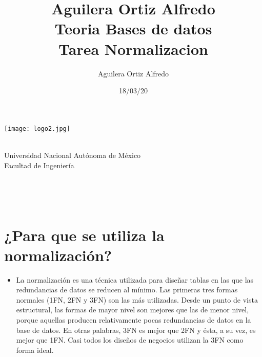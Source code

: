 \documentclass{report}
\title{Aguilera Ortiz Alfredo\\
       Teoria Bases de datos\\
	   Tarea Normalizacion
	   }
\date{18/03/20}
\author{Aguilera Ortiz Alfredo}
\begin{document}
	\begin{titlingpage}
		\begin{center}
			\centering
			\texttt{[image: logo2.jpg]}  
			\begin{LARGE}
				\\Universidad Nacional Autónoma de México\\
				Facultad de Ingeniería\\
			\end{LARGE}
			\vspace{2.5cm}
			\begin{Large}
				\textbf{\thetitle}\\
			\end{Large}
			\vspace{2cm}
			\theauthor\\
			\vspace{2cm}
			\thedate
		\end{center}
	\end{titlingpage}
	\newpage
	
	\section{¿Para que se utiliza la normalización? }
	\begin{itemize}
	\item  La normalización es una técnica utilizada para diseñar tablas en las que las redundancias de 		datos se reducen al mínimo. Las primeras tres formas normales (1FN, 2FN y 3FN) son las más 					utilizadas. Desde un punto de vista estructural, las formas de mayor nivel son mejores que las de 			menor nivel, porque aquellas producen relativamente pocas redundancias de datos en la base de datos. 		En otras palabras, 3FN es mejor que 2FN y ésta, a su vez, es mejor que 1FN. Casi todos los diseños de 	negocios utilizan la 3FN como forma ideal.
	
	\end{itemize}
	
\end{document}
